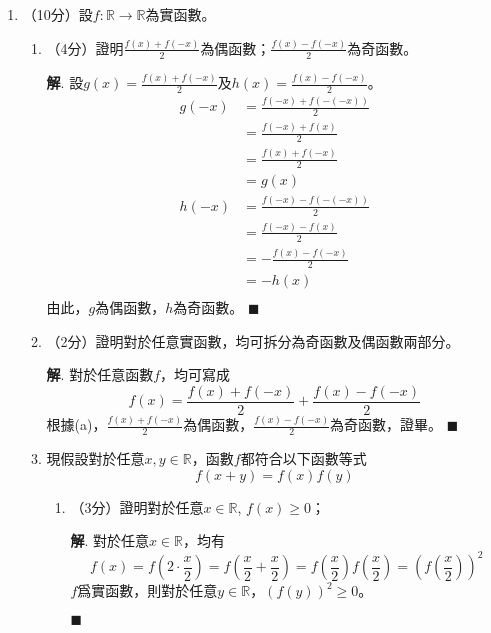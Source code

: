 \documentclass[12pt]{article}
\newenvironment*{sol}{\par \textbf{解}.}{\hfill$\blacksquare$}
\begin{document}
    \begin{enumerate}
        \item （10分）設$f:\mathbb{R}\to\mathbb{R}$為實函數。\begin{enumerate}
            \item （4分）證明$\frac{f(x)+f(-x)}{2}$為偶函數；$\frac{f(x)-f(-x)}{2}$為奇函數。\begin{sol}
                設$g(x)=\frac{f(x)+f(-x)}{2}$及$h(x)=\frac{f(x)-f(-x)}{2}$。\begin{align*}
                    g(-x)&=\frac{f(-x)+f(-(-x))}{2}\\
                    &=\frac{f(-x)+f(x)}{2}\\
                    &=\frac{f(x)+f(-x)}{2}\\
                    &=g(x)\\
                    h(-x)&=\frac{f(-x)-f(-(-x))}{2}\\
                    &=\frac{f(-x)-f(x)}{2}\\
                    &=-\frac{f(x)-f(-x)}{2}\\
                    &=-h(x)\\
                \end{align*}
                由此，$g$為偶函數，$h$為奇函數。
            \end{sol}
            \item （2分）證明對於任意實函數，均可拆分為奇函數及偶函數兩部分。\begin{sol}
                對於任意函數$f$，均可寫成$$f(x)=\frac{f(x)+f(-x)}{2}+\frac{f(x)-f(-x)}{2}$$
                根據(a)，$\frac{f(x)+f(-x)}{2}$為偶函數，$\frac{f(x)-f(-x)}{2}$為奇函數，證畢。
            \end{sol}
            \item 現假設對於任意$x,y\in\mathbb{R}$，函數$f$都符合以下函數等式$$f(x+y)=f(x)f(y)$$\begin{enumerate}
                \item （3分）證明對於任意$x\in\mathbb{R}$, $f(x)\geq 0$；\begin{sol}
                    對於任意$x\in\mathbb{R}$，均有$$f(x)=f(2\cdot\frac{x}{2})=f(\frac{x}{2}+\frac{x}{2})=f(\frac{x}{2})f(\frac{x}{2})=(f(\frac{x}{2}))^2$$
                    $f$爲實函數，則對於任意$y\in\mathbb{R}$，$(f(y))^2\geq 0$。
                    

\end{sol}
\end{enumerate}
\end{enumerate}
\end{enumerate}
\end{document}
